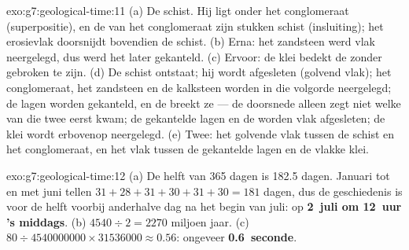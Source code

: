 \begin{solution}{exo:g7:geological-time:11}
(a) De schist. Hij ligt onder het conglomeraat (superpositie), en de
 van het conglomeraat zijn stukken schist (insluiting); het
erosievlak doorsnijdt bovendien de schist. (b) Erna: het zandsteen werd
vlak neergelegd, dus werd het later gekanteld. (c) Ervoor: de klei bedekt
de  zonder gebroken te zijn. (d) De schist ontstaat; hij wordt
afgesleten (golvend vlak); het conglomeraat, het zandsteen en de kalksteen
worden in die volgorde neergelegd; de lagen worden gekanteld, en de 
breekt ze --- de doorsnede alleen zegt niet welke van die twee eerst kwam;
de gekantelde lagen en de  worden vlak afgesleten; de klei wordt
erbovenop neergelegd. (e) Twee: het golvende vlak tussen de schist en het
conglomeraat, en het vlak tussen de gekantelde lagen en de vlakke klei.
\end{solution}

\begin{solution}{exo:g7:geological-time:12}
(a) De helft van 365 dagen is 182.5 dagen. Januari tot en met juni tellen
$31+28+31+30+31+30 = 181$ dagen, dus de geschiedenis is voor de helft
voorbij anderhalve dag na het begin van juli: op \textbf{2~juli om
12~uur 's middags}. (b) $4540 \div 2 = 2270$ miljoen jaar.
(c) $80 \div \num{4540000000} \times \num{31536000} \approx 0.56$:
ongeveer \textbf{0.6~seconde}.
\end{solution}

